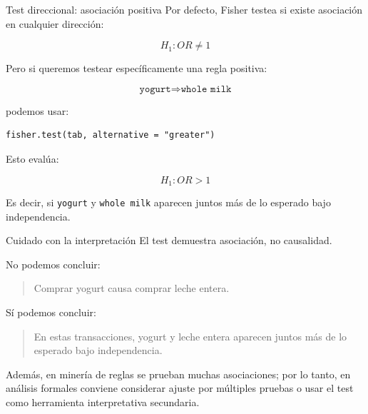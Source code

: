 \documentclass[10pt,aspectratio=169]{beamer}
\begin{document}
\begin{frame}[fragile]{Test direccional: asociación positiva}
Por defecto, Fisher testea si existe asociación en cualquier dirección:

\[
H_1: OR \neq 1
\]

\vspace{0.3cm}
Pero si queremos testear específicamente una regla positiva:

\[
\texttt{yogurt} \Rightarrow \texttt{whole milk}
\]

podemos usar:

\begin{lstlisting}[style=Rstyle]
fisher.test(tab, alternative = "greater")
\end{lstlisting}

\vspace{0.2cm}
Esto evalúa:

\[
H_1: OR > 1
\]

\vspace{0.2cm}
Es decir, si \texttt{yogurt} y \texttt{whole milk} aparecen juntos más de lo esperado bajo independencia.
\end{frame}

\begin{frame}{Cuidado con la interpretación}
\Large
El test demuestra asociación, no causalidad.

\vspace{0.4cm}
\normalsize
No podemos concluir:

\begin{quote}
Comprar yogurt causa comprar leche entera.
\end{quote}

\vspace{0.3cm}
Sí podemos concluir:

\begin{quote}
En estas transacciones, yogurt y leche entera aparecen juntos más de lo esperado bajo independencia.
\end{quote}

\vspace{0.4cm}
Además, en minería de reglas se prueban muchas asociaciones; por lo tanto, en análisis formales conviene considerar ajuste por múltiples pruebas o usar el test como herramienta interpretativa secundaria.
\end{frame}
\end{document}
